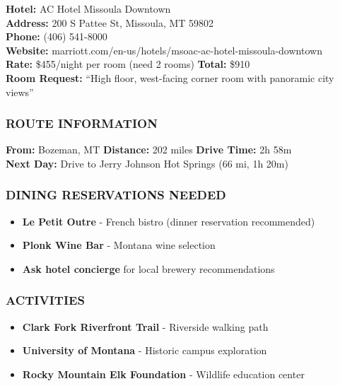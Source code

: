 \documentclass[
  10pt,
]{article}
\providecommand{\tightlist}{%
  \setlength{\itemsep}{0pt}\setlength{\parskip}{0pt}}
\begin{document}
\textbf{\textcolor{secondary}{Hotel:}} AC Hotel Missoula Downtown\\
\textbf{\textcolor{secondary}{Address:}} 200 S Pattee St, Missoula, MT
59802\\
\textbf{\textcolor{secondary}{Phone:}} (406) 541-8000\\
\textbf{\textcolor{secondary}{Website:}}
marriott.com/en-us/hotels/msoac-ac-hotel-missoula-downtown\\
\textbf{\textcolor{secondary}{Rate:}} \$455/night per room (need 2
rooms) \textbar{} \textbf{\textcolor{secondary}{Total:}} \$910\\
\textbf{\textcolor{secondary}{Room Request:}} ``High floor, west-facing
corner room with panoramic city views''

\subsubsection{\texorpdfstring{\textcolor{primary}{ROUTE INFORMATION}}{}}\label{section-13}

\textbf{\textcolor{secondary}{From:}} Bozeman, MT \textbar{}
\textbf{\textcolor{secondary}{Distance:}} 202 miles \textbar{}
\textbf{\textcolor{secondary}{Drive Time:}} 2h 58m\\
\textbf{\textcolor{secondary}{Next Day:}} Drive to Jerry Johnson Hot
Springs (66 mi, 1h 20m)

\subsubsection{\texorpdfstring{\textcolor{primary}{DINING RESERVATIONS NEEDED}}{}}\label{section-14}

\begin{itemize}
\tightlist
\item
  \textbf{\textcolor{secondary}{Le Petit Outre}} - French bistro (dinner
  reservation recommended)
\item
  \textbf{\textcolor{secondary}{Plonk Wine Bar}} - Montana wine
  selection
\item
  \textbf{\textcolor{secondary}{Ask hotel concierge}} for local brewery
  recommendations
\end{itemize}

\subsubsection{\texorpdfstring{\textcolor{primary}{ACTIVITIES}}{}}\label{section-15}

\begin{itemize}
\tightlist
\item
  \textbf{\textcolor{secondary}{Clark Fork Riverfront Trail}} -
  Riverside walking path
\item
  \textbf{\textcolor{secondary}{University of Montana}} - Historic
  campus exploration
\item
  \textbf{\textcolor{secondary}{Rocky Mountain Elk Foundation}} -
  Wildlife education center
\end{itemize}
\end{document}
